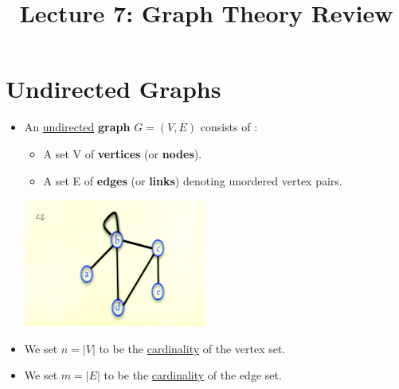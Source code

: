 \documentclass[12pt]{article}
\title{\huge Lecture 7: Graph Theory Review}
\author{}
\date{}
\begin{document}
\maketitle


\section{Undirected Graphs}
\renewcommand{\labelitemii}{$\circ$}
\renewcommand{\labelitemiii}{$\cdot$}
\renewcommand{\labelitemiii}{$\rightarrow$}
\renewcommand{\labelitemiv}{$\star$}
\begin{itemize}
\item An \underline{undirected} \textbf{graph} $G = (V, E)$ consists of :
	\begin{itemize}
	\item A set V of \textbf{vertices} (or \textbf{nodes}).
	\item A set E of  \textbf{edges} (or \textbf{links}) denoting unordered vertex pairs.
	\end{itemize}
\begin{center}
\includegraphics{lecture71}
\end{center}
\item We set $n = |V|$ to be the \underline{cardinality} of the vertex set.
\item We set $m = |E|$ to be the \underline{cardinality} of the edge set.
\end{itemize}
\end{document}

